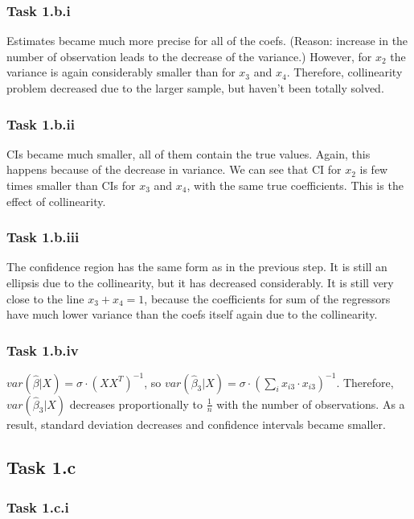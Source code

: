 \documentclass[12pt]{article}
\begin{document}
\subsubsection*{Task 1.b.i}

Estimates became much more precise for all of the coefs. (Reason: increase in the number of observation leads to the decrease of the variance.) However, for $x_2$ the variance is again considerably smaller than for $x_3$ and $x_4$. Therefore, collinearity problem decreased due to the larger sample, but haven't been totally solved.

\subsubsection*{Task 1.b.ii}

CIs became much smaller, all of them contain the true values. Again, this happens because of the decrease in variance. We can see that CI for $x_2$ is few times smaller than CIs for $x_3$ and $x_4$, with the same true coefficients. This is the effect of collinearity.

\subsubsection*{Task 1.b.iii}

The confidence region has the same form as in the previous step. It is still an ellipsis due to the collinearity, but it has decreased considerably. It is still very close to the line $x_3+x_4=1$, because the coefficients for sum of the regressors have much lower variance than the coefs itself again due to the collinearity.

\subsubsection*{Task 1.b.iv}

$var(\hat\beta|X) = \sigma \cdot (XX^T)^{-1}$, so $var(\hat\beta_3|X) = \sigma \cdot (\sum_i x_{i3} \cdot x_{i3})^{-1}$. Therefore, $var(\hat\beta_3|X)$ decreases proportionally to $\frac{1}{n}$ with the number of observations. As a result, standard deviation decreases and confidence intervals became smaller.

\subsection*{Task 1.c}

\subsubsection*{Task 1.c.i}
\end{document}
